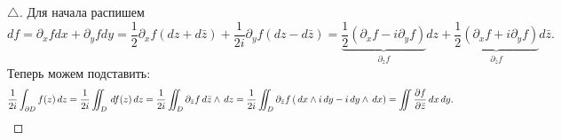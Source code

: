 \begin{proof}[$\triangle$]
Для начала распишем
\begin{equation*}
    d f = \partial_x f d x + \partial_y f d y = 
    \frac{1}{2} \partial_x f (d z + d \bar{z}) + \frac{1}{2i} \partial_y f (d z - d \bar{z}) = 
    \underbrace{\frac{1}{2} (\partial_x f - i \partial_y f)}_{\partial_z f} d z
    +\underbrace{\frac{1}{2} (\partial_x f + i \partial_y f)}_{\partial_{\bar{z}} f} d \bar{z}.
\end{equation*}
Теперь можем подставить:
\begin{equation*}
    \frac{1}{2i} \int_{\partial D} f(z) \, d z = \frac{1}{2i} \iint_D  \, d f(z) \, d z =
    \frac{1}{2i} \iint_D \partial_{\bar{z}} f \, d \bar{z} \wedge \, d z = \frac{1}{2i} \iint_D \partial_{\bar{z}} f \left(
        \, d x \wedge i \, d y - i \, d y \wedge \, d x
    \right) = 
    \iint \frac{\partial f}{\partial \bar{z}} \, d x \, d y.
\end{equation*}

\end{proof}
